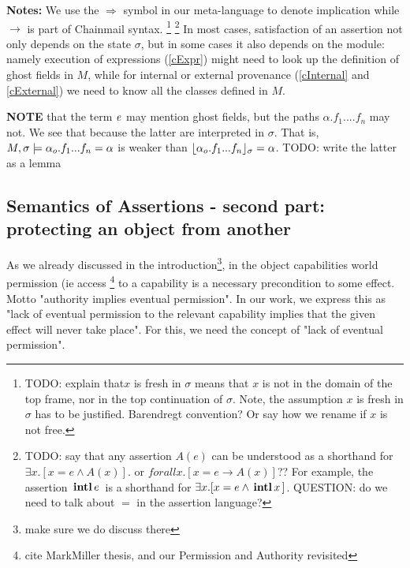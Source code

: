\textbf{Notes:}  We use the $\Longrightarrow$ symbol in our meta-language to denote implication while $\rightarrow$ is part of Chainmail syntax.
\footnote{{TODO: explain that$x$ is fresh in $\sigma$  means that $x$ is not in the domain of the top frame, nor in the top continuation of $\sigma$.
 Note, the assumption $x$ is fresh in $\sigma$ has to be justified. Barendregt convention? Or say how we rename if $x$ is not free.}}
\footnote{{TODO: say that any assertion $A(e)$ can be understood as a shorthand for $\exists x. [ x=e \wedge A(x)]$. or  $forall x. [ x=e \rightarrow A(x)]$?? For example, the  assertion   ${{\, \mathbf{intl}\, e\, }}$ is a shorthand for $\exists x. [ x=e \wedge {{\ensuremath{\, \mathbf{intl}}\, x\, }}]$. QUESTION: do we need to talk about $=$ in the assertion language?}}
In most cases, satisfaction of an assertion not only depends on the state $\sigma$, but 
in some cases it also depends on the module: namely execution of expressions (\ref{cExpr}) might need to look up the definition of ghost fields  in $M$, while 
for internal or external provenance (\ref{cInternal} and \ref{cExternal}) we need to know all the classes defined in $M$.

{\textbf{NOTE}  that the term $\mathit{e}$ may mention ghost fields, but the paths $\alpha.f_1....f_n$ may not. We see that because the latter are interpreted in $\sigma$. That is, $M , \sigma \models {\alpha_o.f_1...f_n}=\alpha$ is weaker than $\lfloor \alpha_{o}.f_1...f_n \rfloor_{\sigma}=\alpha$. TODO: write the latter as a lemma}


\subsection{Semantics of Assertions - second part:
protecting an object from another}

As we already discussed in the introduction\footnote{make sure we do discuss there}, in the object capabilities world permission (ie access  \footnote{cite MarkMiller thesis, and our Permission and Authority revisited} to a capability is a necessary precondition to some effect. Motto "authority implies eventual permission".
In our work, we express this as "lack of eventual permission to the relevant capability implies that the given effect will never take place".
For this, we need the concept of "lack of  eventual permission".  


